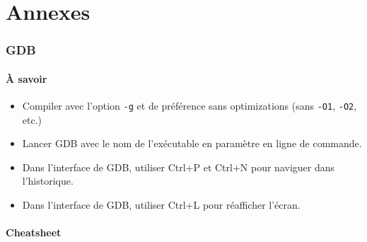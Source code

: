 \part{Annexes}

\section{GDB}

\subsection{À savoir}

\begin{itemize}
	\item Compiler avec l'option \texttt{-g} et de préférence sans
		optimizations (sans \texttt{-O1}, \texttt{-O2}, etc.)
	\item Lancer GDB avec le nom de l'exécutable en paramètre en
		ligne de commande.
	\item Dans l'interface de GDB, utiliser Ctrl+P et Ctrl+N pour
		naviguer dans l'historique.
	\item Dans l'interface de GDB, utiliser Ctrl+L pour réafficher l'écran.
\end{itemize}

\subsection{Cheatsheet}

